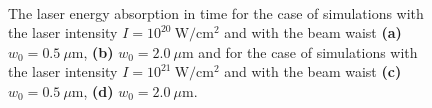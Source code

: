 \begin{figure}[h!]
	\centering
	\\
	\caption{The laser energy absorption in time for the case of simulations with the laser intensity $ I = 10^{20} \ \mathrm{W/cm^2} $ and with the beam waist \textbf{(a)} $ w_0 = 0.5 \ \mu\mathrm{m} $, \textbf{(b)} $ w_0 = 2.0 \ \mu\mathrm{m} $ and for the case of simulations with the laser intensity $ I = 10^{21} \ \mathrm{W/cm^2} $ and with the beam waist \textbf{(c)} $ w_0 = 0.5 \ \mu\mathrm{m} $, \textbf{(d)} $ w_0 = 2.0 \ \mu\mathrm{m} $.}
	\label{fig:10}
\end{figure}

